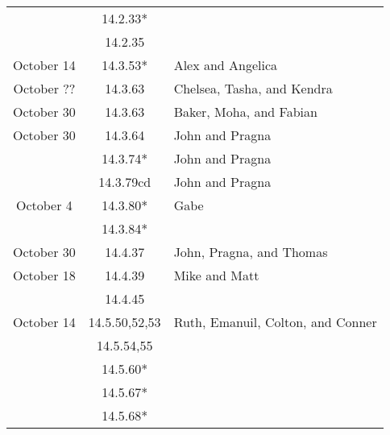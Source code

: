 \documentclass[12pt]{amsart}
\begin{document}
\begin{longtable}{c|c|l}
                        & 14.2.33*                             &                                          \\
                        & 14.2.35                              &                                          \\
        October 14      & 14.3.53*                             & Alex and Angelica                        \\
        October ??      & 14.3.63                              & Chelsea, Tasha, and Kendra               \\
        October 30      & 14.3.63                              & Baker, Moha, and Fabian                  \\
        October 30      & 14.3.64                              & John and Pragna                          \\
                        & 14.3.74*                             & John and Pragna                          \\
                        & 14.3.79cd                            & John and Pragna                          \\
        October 4       & 14.3.80*                             & Gabe                                     \\
                        & 14.3.84*                             &                                          \\
        October 30      & 14.4.37                              & John, Pragna, and Thomas                 \\
        October 18      & 14.4.39                              & Mike and Matt                            \\
                        & 14.4.45                              &                                          \\
        October 14      & 14.5.50,52,53                        & Ruth, Emanuil, Colton, and Conner        \\
                        & 14.5.54,55                           &                                          \\
                        & 14.5.60*                             &                                          \\
                        & 14.5.67*                             &                                          \\
                        & 14.5.68*                             &                                          \\

\end{longtable}
\end{document}
